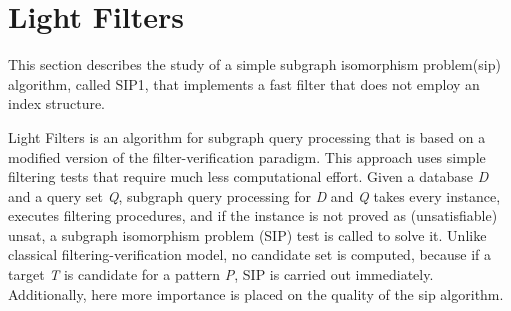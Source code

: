 \documentclass{l4proj}
\begin{document}





\chapter{Light Filters}
\label{ch:sip1}
This section describes the study of a simple subgraph isomorphism problem(\gls{sip}) algorithm, called SIP1, that implements a fast filter that does not employ an index structure.

Light Filters is an algorithm for subgraph query processing that is based on a modified version of the filter-verification paradigm. This approach uses simple filtering tests that require much less computational effort. 
Given a database \emph{D} and a query set \emph{Q}, subgraph query processing for \emph{D} and \emph{Q} takes every instance, executes filtering procedures, and if the instance is not proved as (unsatisfiable) \gls{unsat}, a subgraph isomorphism problem (SIP) test is called to solve it. Unlike classical filtering-verification model, no candidate set is computed, because if a target \emph{T} is candidate for a pattern \emph{P}, SIP is carried out immediately. Additionally, here more importance is placed on the quality of the \gls{sip} algorithm. 
\end{document}
